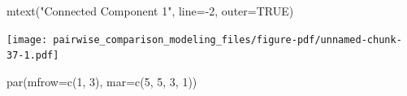 \documentclass[
  letterpaper,
  DIV=11,
  numbers=noendperiod]{scrartcl}
\newenvironment{Shaded}{\begin{snugshade}}{\end{snugshade}}
\newcommand{\AttributeTok}[1]{\textcolor[rgb]{0.40,0.45,0.13}{#1}}
\newcommand{\ConstantTok}[1]{\textcolor[rgb]{0.56,0.35,0.01}{#1}}
\newcommand{\DecValTok}[1]{\textcolor[rgb]{0.68,0.00,0.00}{#1}}
\newcommand{\FunctionTok}[1]{\textcolor[rgb]{0.28,0.35,0.67}{#1}}
\newcommand{\NormalTok}[1]{\textcolor[rgb]{0.00,0.23,0.31}{#1}}
\newcommand{\SpecialCharTok}[1]{\textcolor[rgb]{0.37,0.37,0.37}{#1}}
\newcommand{\StringTok}[1]{\textcolor[rgb]{0.13,0.47,0.30}{#1}}
\begin{document}
\begin{Shaded}
\begin{Highlighting}[]
\FunctionTok{mtext}\NormalTok{(}\StringTok{"Connected Component 1"}\NormalTok{, }\AttributeTok{line=}\SpecialCharTok{{-}}\DecValTok{2}\NormalTok{, }\AttributeTok{outer=}\ConstantTok{TRUE}\NormalTok{)}
\end{Highlighting}
\end{Shaded}

\texttt{[image: pairwise\_comparison\_modeling\_files/figure-pdf/unnamed-chunk-37-1.pdf]}

\begin{Shaded}
\begin{Highlighting}[]
\FunctionTok{par}\NormalTok{(}\AttributeTok{mfrow=}\FunctionTok{c}\NormalTok{(}\DecValTok{1}\NormalTok{, }\DecValTok{3}\NormalTok{), }\AttributeTok{mar=}\FunctionTok{c}\NormalTok{(}\DecValTok{5}\NormalTok{, }\DecValTok{5}\NormalTok{, }\DecValTok{3}\NormalTok{, }\DecValTok{1}\NormalTok{))}


\end{Highlighting}
\end{Shaded}
\end{document}
